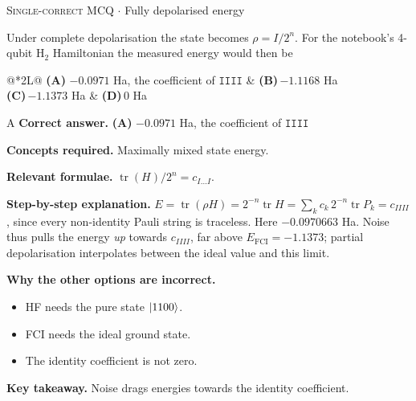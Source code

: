 \documentclass[11pt,a4paper]{article}
\newcommand{\optlabel}[1]{\textbf{(#1)}}
\newcommand{\correctlabel}[1]{\textcolor{okgreen}{\textbf{(#1)}\,\ding{51}}}
\newenvironment{qitem}[1]{\begin{list}{}{\setlength{\leftmargin}{3.3em}\setlength{\labelwidth}{3.1em}%
  \setlength{\labelsep}{0.2em}\setlength{\topsep}{3pt}\setlength{\parsep}{3pt}}\item[\textbf{Q.#1}\hfill]}{\end{list}}
\newcommand{\qsep}{\par\vspace{2pt}{\color{black!15}\hrule}\vspace{4pt}}
\newcommand{\qmeta}[2]{{\footnotesize\color{black!60}\textsc{#1} \;$\cdot$\; #2}\par}
\begin{document}
\begin{qitem}{70}
\qmeta{Single-correct MCQ}{Fully depolarised energy}
Under complete depolarisation the state becomes $\rho = I/2^n$. For the notebook's 4-qubit H$_2$ Hamiltonian the measured energy would then be
\par\smallskip\noindent\begin{tabularx}{\linewidth}{@{}*{2}{L}@{}}
\correctlabel{A}\,$-0.0971$ Ha, the coefficient of $\texttt{IIII}$ & \optlabel{B}\,$-1.1168$ Ha \\[3pt]
\optlabel{C}\,$-1.1373$ Ha & \optlabel{D}\,$0$ Ha
\end{tabularx}
\end{qitem}
\begin{solbox}{A}
\textbf{\color{brand}Correct answer.} \textcolor{okgreen}{\textbf{(A)}} $-0.0971$ Ha, the coefficient of $\texttt{IIII}$

\textbf{\color{brand}Concepts required.} Maximally mixed state energy.

\textbf{\color{brand}Relevant formulae.} $\operatorname{tr}(H)/2^n = c_{I\dots I}$.

\textbf{\color{brand}Step-by-step explanation.} $E = \operatorname{tr}(\rho H) = 2^{-n}\operatorname{tr}H = \sum_kc_k\,2^{-n}\operatorname{tr}P_k = c_{IIII}$, since every non-identity Pauli string is traceless. Here $-0.0970663$ Ha.
Noise thus pulls the energy \emph{up} towards $c_{IIII}$, far above $E_{\mathrm{FCI}} = -1.1373$; partial depolarisation interpolates between the ideal
value and this limit.

\textbf{\color{brand}Why the other options are incorrect.}
\begin{itemize}[leftmargin=2.4em, itemsep=1pt, topsep=2pt]
\item[\textbf{(B)}] HF needs the pure state $\ket{1100}$.
\item[\textbf{(C)}] FCI needs the ideal ground state.
\item[\textbf{(D)}] The identity coefficient is not zero.
\end{itemize}
\textbf{\color{brand}Key takeaway.} Noise drags energies towards the identity coefficient.
\end{solbox}
\qsep
\end{document}
